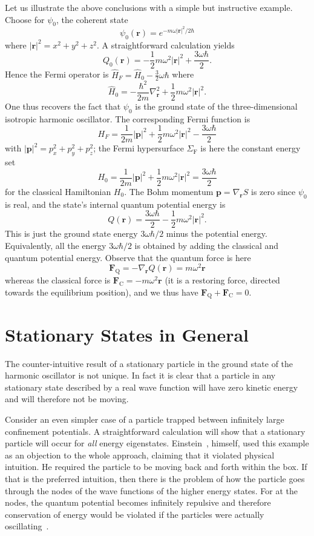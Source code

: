 \documentclass[12pt]{article}%
\begin{document}
Let us illustrate the above conclusions with a simple but instructive example.
Choose for $\psi_{0}$, the coherent state
\[
\psi_{0}(\mathbf{r})=e^{-m\omega|\mathbf{r}|^{2}/2\hbar}%
\]
where $|\mathbf{r}|^{2}=x^{2}+y^{2}+z^{2}$. A straightforward calculation
yields%
\[
Q_{0}(\mathbf{r})=-\frac{1}{2}m\omega^{2}|\mathbf{r}|^{2}+\frac{3\omega\hbar
}{2}.
\]
Hence the Fermi operator is $\widehat{H}_{F}=\widehat{H}_{0}-\frac{3}{2}%
\omega\hbar$ where
\[
\widehat{H}_{0}=-\frac{\hbar^{2}}{2m}\nabla_{\mathbf{r}}^{2}+\frac{1}%
{2}m\omega^{2}|\mathbf{r}|^{2}.
\]
One thus recovers the fact that $\psi_{0}$ is the ground state of the
three-dimensional isotropic harmonic oscillator. The corresponding Fermi
function is
\[
H_{F}=\frac{1}{2m}|\mathbf{p}|^{2}+\frac{1}{2}m\omega^{2}|\mathbf{r}%
|^{2}-\frac{3\omega\hbar}{2}%
\]
with $|\mathbf{p}|^{2}=p_{x}^{2}+p_{y}^{2}+p_{z}^{2}$; the Fermi hypersurface
$\Sigma_{\mathrm{F}}$ is here the constant energy set
\[
H_{0}=\frac{1}{2m}|\mathbf{p}|^{2}+\frac{1}{2}m\omega^{2}|\mathbf{r}%
|^{2}=\frac{3\omega\hbar}{2}%
\]
for the classical Hamiltonian $H_{0}$. The Bohm momentum $\mathbf{p}%
=\nabla_{\mathbf{r}}S$ is zero since $\psi_{0}$ is real, and the state's
internal quantum potential energy is
\begin{equation}
Q(\mathbf{r})=\frac{3\omega\hbar}{2}-\frac{1}{2}m\omega^{2}|\mathbf{r}|^{2}.
\label{qr}%
\end{equation}
This is just the ground state energy $3\omega\hbar/2$ minus the potential
energy. Equivalently, all the energy $3\omega\hbar/2$ is obtained by adding
the classical and quantum potential energy. Observe that the quantum force is
here
\[
\mathbf{F}_{\mathrm{Q}}=-\nabla_{\mathbf{r}}Q(\mathbf{r})=m\omega
^{2}\mathbf{r}%
\]
whereas the classical force is $\mathbf{F}_{\mathrm{C}}=-m\omega^{2}%
\mathbf{r}$ (it is a restoring force, directed towards the equilibrium
position), and we thus have $\mathbf{F}_{\mathrm{Q}}+\mathbf{F}_{\mathrm{C}%
}=0$.

\section{Stationary States in General\label{sec:other}}

The counter-intuitive result of a stationary particle in the ground state of
the harmonic oscillator is not unique. In fact it is clear that a particle in
any stationary state described by a real wave function will have zero kinetic
energy and will therefore not be moving.

Consider an even simpler case of a particle trapped between infinitely large
confinement potentials. A straightforward calculation will show that a
stationary particle will occur for \emph{all} energy eigenstates.
Einstein~\cite{ae53}, himself, used this example as an objection to the whole
approach, claiming that it violated physical intuition. He required the
particle to be moving back and forth within the box. If that is the preferred
intuition, then there is the problem of how the particle goes through the
nodes of the wave functions of the higher energy states. For at the nodes, the
quantum potential becomes infinitely repulsive and therefore conservation of
energy would be violated if the particles were actually
oscillating~\cite{dbbh85}.
\end{document}
